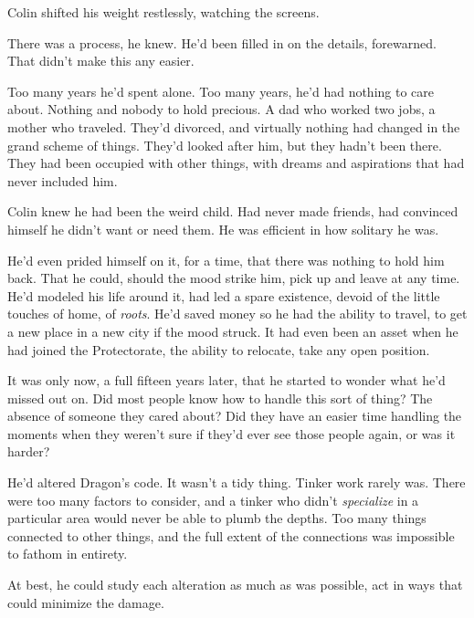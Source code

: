 \sectionbreak



Colin shifted his weight restlessly, watching the screens.



There was a process, he knew.  He'd been filled in on the details, forewarned.  That didn't make this any easier.



Too many years he'd spent alone.  Too many years, he'd had nothing to care about.  Nothing and nobody to hold precious.  A dad who worked two jobs, a mother who traveled.  They'd divorced, and virtually nothing had changed in the grand scheme of things.  They'd looked after him, but they hadn't been there.  They had been occupied with other things, with dreams and aspirations that had never included him.



Colin knew he had been the weird child.  Had never made friends, had convinced himself he didn't want or need them.  He was efficient in how solitary he was.



He'd even prided himself on it, for a time, that there was nothing to hold him back.  That he could, should the mood strike him, pick up and leave at any time.  He'd modeled his life around it, had led a spare existence, devoid of the little touches of home, of \emph{roots}.  He'd saved money so he had the ability to travel, to get a new place in a new city if the mood struck.  It had even been an asset when he had joined the Protectorate, the ability to relocate, take any open position.



It was only now, a full fifteen years later, that he started to wonder what he'd missed out on.  Did most people know how to handle this sort of thing?  The absence of someone they cared about?  Did they have an easier time handling the moments when they weren't sure if they'd ever see those people again, or was it harder?



He'd altered Dragon's code.  It wasn't a tidy thing.  Tinker work rarely was.  There were too many factors to consider, and a tinker who didn't \emph{specialize} in a particular area would never be able to plumb the depths.  Too many things connected to other things, and the full extent of the connections was impossible to fathom in entirety.



At best, he could study each alteration as much as was possible, act in ways that could minimize the damage.




